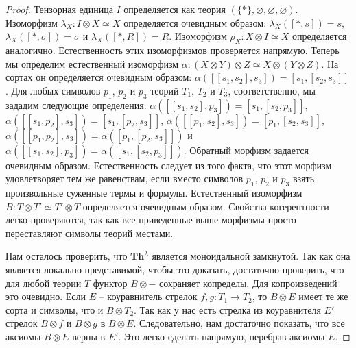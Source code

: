 \documentclass[reqno]{amsart}
\theoremstyle{definition}
\theoremstyle{remark}
\newcommand{\bcat}[1]{\mathbf{#1}}
\newcommand{\Th}{\bcat{Th}}
\begin{document}
\begin{proof}
Тензорная единица $I$ определяется как теория $(\{*\},\varnothing,\varnothing,\varnothing)$.
Изоморфизм $\lambda_X : I \otimes X \simeq X$ определяется очевидным образом: $\lambda_X([*,s]) = s$, $\lambda_X([*,\sigma]) = \sigma$ и $\lambda_X([*,R]) = R$.
Изоморфизм $\rho_X : X \otimes I \simeq X$ определяется аналогично.
Естественность этих изоморфизмов проверяется напрямую.
Теперь мы определим естественный изоморфизм $\alpha : (X \otimes Y) \otimes Z \simeq X \otimes (Y \otimes Z)$.
На сортах он определяется очевидным образом: $\alpha([[s_1,s_2],s_3]) = [s_1,[s_2,s_3]]$.
Для любых символов $p_1$, $p_2$ и $p_3$ теорий $T_1$, $T_2$ и $T_3$, соответственно, мы зададим следующие определения:
$\alpha([[s_1,s_2],p_3]) = [s_1,[s_2,p_3]]$, $\alpha([[s_1,p_2],s_3]) = [s_1,[p_2,s_3]]$, $\alpha([[p_1,s_2],s_3]) = [p_1,[s_2,s_3]]$, $\alpha([[p_1,p_2],s_3]) = \alpha([p_1,[p_2,s_3]])$ и $\alpha([[s_1,s_2],p_3]) = \alpha([s_1,[s_2,p_3]])$.
Обратный морфизм задается очевидным образом.
Естественность следует из того факта, что этот морфизм удовлетворяет тем же равенствам, если вместо символов $p_1$, $p_2$ и $p_3$ взять произвольные суженные термы и формулы.
Естественный изоморфизм $B : T \otimes T' \simeq T' \otimes T$ определяется очевидным образом.
Свойства когерентности легко проверяются, так как все приведенные выше морфизмы просто переставляют символы теорий местами.

Нам осталось проверить, что $\Th^\lambda$ является моноидальной замкнутой.
Так как она является локально представимой, чтобы это доказать, достаточно проверить, что для любой теории $T$ функтор $B \otimes -$ сохраняет копределы.
Для копроизведений это очевидно.
Если $E$ -- коуравнитель стрелок $f,g : T_1 \to T_2$, то $B \otimes E$ имеет те же сорта и символы, что и $B \otimes T_2$.
Так как у нас есть стрелка из коуравнителя $E'$ стрелок $B \otimes f$ и $B \otimes g$ в $B \otimes E$.
Следовательно, нам достаточно показать, что все аксиомы $B \otimes E$ верны в $E'$.
Это легко сделать напрямую, перебрав аксиомы $E$.
\end{proof}
\end{document}
